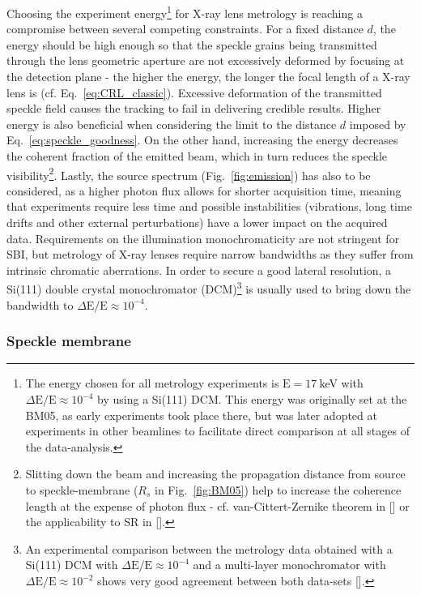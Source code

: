 \begin{refsection}
Choosing the experiment energy\footnote{ The energy chosen for all metrology experiments is $\text{E}=17~$keV with $\Delta \text{E}/\text{E}\approx10^{-4}$ by using a Si(111) DCM. This energy was originally set at the BM05, as early experiments took place there, but was later adopted at experiments in other beamlines to facilitate direct comparison at all stages of the data-analysis.} for X-ray lens metrology is reaching a compromise between several competing constraints. For a fixed distance $d$, the energy should be high enough so that the speckle grains being transmitted through the lens geometric aperture are not excessively deformed by focusing at the detection plane - the higher the energy, the longer the focal length of a X-ray lens is (cf. Eq.~\ref{eq:CRL_classic}). Excessive deformation of the transmitted speckle field causes the tracking to fail in delivering credible results. Higher energy is also beneficial when considering the limit to the distance $d$ imposed by Eq.~\ref{eq:speckle_goodness}. On the other hand, increasing the energy decreases the coherent fraction of the emitted beam, which in turn reduces the speckle visibility\footnote{Slitting down the beam and increasing the propagation distance from source to speckle-membrane ($R_s$ in Fig.~\ref{fig:BM05}) help to increase the coherence length at the expense of photon flux - cf. van-Cittert-Zernike theorem in [\cite[\textit{§4.4.4}]{Mandel1995}] or the applicability to SR in [\cite[\textit{§4}]{Geloni2008}].}. Lastly, the source spectrum (Fig.~\ref{fig:emission}) has also to be considered, as a higher photon flux allows for shorter acquisition time, meaning that experiments require less time and possible instabilities (vibrations, long time drifts and other external perturbations) have a lower impact on the acquired data. Requirements on the illumination monochromaticity are not stringent for SBI, but metrology of X-ray lenses require narrow bandwidths as they suffer from intrinsic chromatic aberrations. In order to secure a good lateral resolution, a Si(111) double crystal monochromator (DCM)\footnote{An experimental comparison between the metrology data obtained with a Si(111) DCM with $\Delta \text{E}/\text{E}\approx10^{-4}$ and a multi-layer monochromator with $\Delta \text{E}/\text{E}\approx10^{-2}$ shows very good agreement between both data-sets [\cite[\textit{\S3.3.3}]{Berujon2020a}].} is usually used to bring down the bandwidth to $\Delta \text{E}/\text{E}\approx10^{-4}$.

\subsubsection*{Speckle membrane}


\end{refsection}
